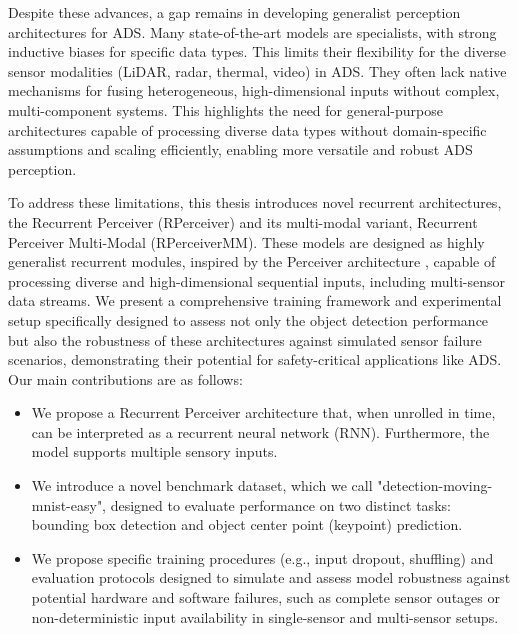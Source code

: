 
Despite these advances, a gap remains in developing generalist perception architectures for ADS. Many state-of-the-art models are specialists, with strong inductive biases for specific data types. This limits their flexibility for the diverse sensor modalities (LiDAR, radar, thermal, video) in ADS. They often lack native mechanisms for fusing heterogeneous, high-dimensional inputs without complex, multi-component systems. This highlights the need for general-purpose architectures capable of processing diverse data types without domain-specific assumptions and scaling efficiently, enabling more versatile and robust ADS perception.



To address these limitations, this thesis introduces novel recurrent architectures, the Recurrent Perceiver (RPerceiver) and its multi-modal variant, Recurrent Perceiver Multi-Modal (RPerceiverMM). These models are designed as highly generalist recurrent modules, inspired by the Perceiver architecture \cite{jaeglePerceiverGeneralPerception2021}, capable of processing diverse and high-dimensional sequential inputs, including multi-sensor data streams. We present a comprehensive training framework and experimental setup specifically designed to assess not only the object detection performance but also the robustness of these architectures against simulated sensor failure scenarios, demonstrating their potential for safety-critical applications like ADS. Our main contributions are as follows:

\begin{itemize}
    \item We propose a Recurrent Perceiver architecture that, when unrolled in time, can be interpreted as a recurrent neural network (RNN). Furthermore, the model supports multiple sensory inputs.
    \item We introduce a novel benchmark dataset, which we call "detection-moving-mnist-easy", designed to evaluate performance on two distinct tasks: bounding box detection and object center point (keypoint) prediction.    
    \item We propose specific training procedures (e.g., input dropout, shuffling) and evaluation protocols designed to simulate and assess model robustness against potential hardware and software failures, such as complete sensor outages or non-deterministic input availability in single-sensor and multi-sensor setups.
\end{itemize}

